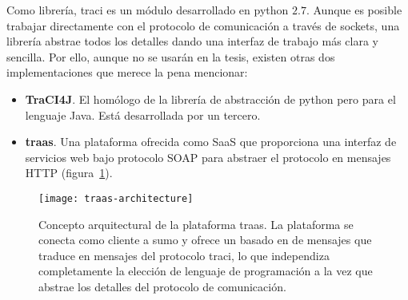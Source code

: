 Como librería, \gls{traci} es un módulo desarrollado en \gls{python} $2$.$7$. Aunque es posible trabajar directamente con el protocolo de comunicación a través de sockets, una librería abstrae todos los detalles dando una interfaz de trabajo más clara y sencilla. Por ello, aunque no se usarán en la tesis, existen otras dos implementaciones que merece la pena mencionar:

\begin{itemize}
	\item \textbf{TraCI4J}. El homólogo de la librería de abstracción de \gls{python} pero para el lenguaje Java. Está desarrollada por un tercero.
	\item \textbf{\gls{traas}}. Una plataforma ofrecida como SaaS que proporciona una interfaz de servicios web bajo protocolo SOAP para abstraer el protocolo en mensajes HTTP (figura~\ref{fig:traas}).
\end{itemize}

\begin{figure}
	\centering
	\texttt{[image: traas-architecture]}
	\caption[Arquitectura de la plataforma \gls{traas}]{Concepto arquitectural de la plataforma \gls{traas}. La plataforma se conecta como cliente a \gls{sumo} y ofrece un  basado en  de mensajes que traduce en mensajes del protocolo \gls{traci}, lo que independiza completamente la elección de lenguaje de programación a la vez que abstrae los detalles del protocolo de comunicación.}
	\label{fig:traas}
\end{figure}
